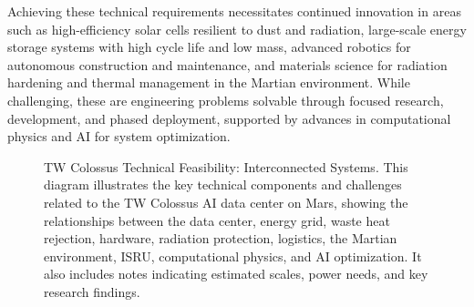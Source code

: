 \documentclass[fontsize=10pt, oneside, DIV=calc]{scrartcl}
\begin{document}
\medskip

\noindent
Achieving these technical requirements necessitates continued innovation in areas such as high-efficiency solar cells resilient to dust and radiation, large-scale energy storage systems with high cycle life and low mass, advanced robotics for autonomous construction and maintenance, and materials science for radiation hardening and thermal management in the Martian environment. While challenging, these are engineering problems solvable through focused research, development, and phased deployment, supported by advances in computational physics and AI for system optimization.

\medskip



\begin{figure}[H]
  \centering
  \noindent
  \begin{minipage}{\textwidth}
    \centering
    \caption{TW Colossus Technical Feasibility: Interconnected Systems. This diagram illustrates the key technical components and challenges related to the TW Colossus AI data center on Mars, showing the relationships between the data center, energy grid, waste heat rejection, hardware, radiation protection, logistics, the Martian environment, ISRU, computational physics, and AI optimization. It also includes notes indicating estimated scales, power needs, and key research findings.}
  \end{minipage}
\end{figure}
\end{document}
